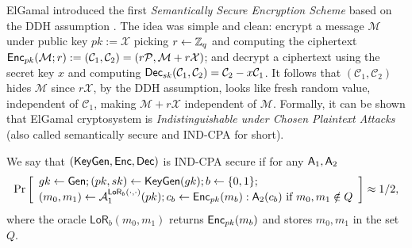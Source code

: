 ElGamal introduced the first \emph{Semantically Secure Encryption Scheme} based on the DDH assumption \cite{ElGamal85}. The idea was simple and clean: encrypt a message $\mathcal{M}$ under public key $pk:=\mathcal{X}$ picking $r\gets\mathbb{Z}_q$ and computing the ciphertext $\mathsf{Enc}_{pk}(\mathcal{M};r):=(\mathcal{C}_1,\mathcal{C}_2)=(r\mathcal{P},\mathcal{M}+r\mathcal{X})$; and decrypt a ciphertext using the secret key $x$ and computing $\mathsf{Dec}_{sk}(\mathcal{C}_1,\mathcal{C}_2)=\mathcal{C}_2-x\mathcal{C}_1$. It follows that $(\mathcal{C}_1,\mathcal{C}_2)$ hides $\mathcal{M}$ since $r\mathcal{X}$, by the DDH assumption, looks like fresh random value, independent of $\mathcal{C}_1$, making $\mathcal{M}+r\mathcal{X}$ independent of $\mathcal{M}$. Formally, it can be shown that ElGamal cryptosystem is \emph{Indistinguishable under Chosen Plaintext Attacks} (also called semantically secure and IND-CPA for short).

\begin{definition}
We say that $(\mathsf{KeyGen},\mathsf{Enc},\mathsf{Dec})$ is IND-CPA secure if for any $\mathsf{A}_1,\mathsf{A}_2$
$$
\Pr\left[\begin{array}{l}
gk\gets\mathsf{Gen};(pk,sk)\gets\mathsf{KeyGen}(gk);b\gets\{0,1\};\\
(m_0,m_1)\gets\mathcal{A}_1^{\mathsf{LoR}_b(\cdot,\cdot)}(pk);
c_b\gets\mathsf{Enc}_{pk}(m_b):\mathsf{A}_2(c_b)\text{ if }m_0,m_1\notin Q
\end{array}\right]\approx 1/2,
$$
where the oracle $\mathsf{LoR}_b(m_0,m_1)$ returns $\mathsf{Enc}_{pk}(m_b)$ and stores $m_0,m_1$ in the set $Q$.
\end{definition}
 
